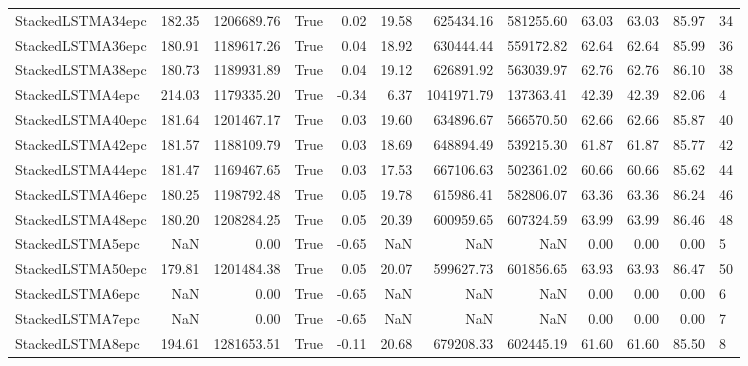 \begin{tabular}{lrrlrrrrrrrl}
StackedLSTMA34epc & 182.35 & 1206689.76 & True & 0.02 & 19.58 & 625434.16 & 581255.60 & 63.03 & 63.03 & 85.97 & 34 \\
StackedLSTMA36epc & 180.91 & 1189617.26 & True & 0.04 & 18.92 & 630444.44 & 559172.82 & 62.64 & 62.64 & 85.99 & 36 \\
StackedLSTMA38epc & 180.73 & 1189931.89 & True & 0.04 & 19.12 & 626891.92 & 563039.97 & 62.76 & 62.76 & 86.10 & 38 \\
StackedLSTMA4epc & 214.03 & 1179335.20 & True & -0.34 & 6.37 & 1041971.79 & 137363.41 & 42.39 & 42.39 & 82.06 & 4 \\
StackedLSTMA40epc & 181.64 & 1201467.17 & True & 0.03 & 19.60 & 634896.67 & 566570.50 & 62.66 & 62.66 & 85.87 & 40 \\
StackedLSTMA42epc & 181.57 & 1188109.79 & True & 0.03 & 18.69 & 648894.49 & 539215.30 & 61.87 & 61.87 & 85.77 & 42 \\
StackedLSTMA44epc & 181.47 & 1169467.65 & True & 0.03 & 17.53 & 667106.63 & 502361.02 & 60.66 & 60.66 & 85.62 & 44 \\
StackedLSTMA46epc & 180.25 & 1198792.48 & True & 0.05 & 19.78 & 615986.41 & 582806.07 & 63.36 & 63.36 & 86.24 & 46 \\
StackedLSTMA48epc & 180.20 & 1208284.25 & True & 0.05 & 20.39 & 600959.65 & 607324.59 & 63.99 & 63.99 & 86.46 & 48 \\
StackedLSTMA5epc & NaN & 0.00 & True & -0.65 & NaN & NaN & NaN & 0.00 & 0.00 & 0.00 & 5 \\
StackedLSTMA50epc & 179.81 & 1201484.38 & True & 0.05 & 20.07 & 599627.73 & 601856.65 & 63.93 & 63.93 & 86.47 & 50 \\
StackedLSTMA6epc & NaN & 0.00 & True & -0.65 & NaN & NaN & NaN & 0.00 & 0.00 & 0.00 & 6 \\
StackedLSTMA7epc & NaN & 0.00 & True & -0.65 & NaN & NaN & NaN & 0.00 & 0.00 & 0.00 & 7 \\
StackedLSTMA8epc & 194.61 & 1281653.51 & True & -0.11 & 20.68 & 679208.33 & 602445.19 & 61.60 & 61.60 & 85.50 & 8 \\
\bottomrule
\end{tabular}
